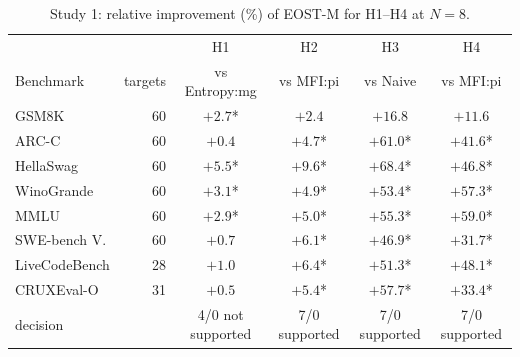 \begin{table}[htbp]
\centering\footnotesize
\caption{Study 1: relative improvement (\%) of EOST-M for H1--H4 at $N=8$.}
\label{tab:confirm}
\setlength{\tabcolsep}{5pt}
\begin{tabular}{@{}lrcccc@{}}
\toprule
 & & H1 & H2 & H3 & H4 \\
Benchmark & targets & vs Entropy:mg & vs MFI:pi & vs Naive & vs MFI:pi \\
\midrule
GSM8K & 60 & $+2.7$* & $+2.4$ & $+16.8$ & $+11.6$ \\
ARC-C & 60 & $+0.4$ & $+4.7$* & $+61.0$* & $+41.6$* \\
HellaSwag & 60 & $+5.5$* & $+9.6$* & $+68.4$* & $+46.8$* \\
WinoGrande & 60 & $+3.1$* & $+4.9$* & $+53.4$* & $+57.3$* \\
MMLU & 60 & $+2.9$* & $+5.0$* & $+55.3$* & $+59.0$* \\
SWE-bench V. & 60 & $+0.7$ & $+6.1$* & $+46.9$* & $+31.7$* \\
LiveCodeBench & 28 & $+1.0$ & $+6.4$* & $+51.3$* & $+48.1$* \\
CRUXEval-O & 31 & $+0.5$ & $+5.4$* & $+57.7$* & $+33.4$* \\
\midrule
decision & & 4/0 not supported & 7/0 supported & 7/0 supported & 7/0 supported \\
\bottomrule
\end{tabular}
\end{table}
